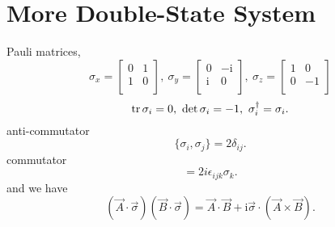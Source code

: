 
\setcounter{chapter}{10}
\chapter[更多的双态系统]{More Double-State System}

Pauli matrices, 
\begin{equation}
  \sigma_{x} = \begin{bmatrix}
   0 & 1\\
   1 & 0\\
  \end{bmatrix}
  , \ 
  \sigma_{y} = \begin{bmatrix}
   0 & -\mathrm{i} \\
   \mathrm{i}  & 0\\
  \end{bmatrix}
  , \
  \sigma_{z} = \begin{bmatrix}
   1 & 0\\
   0 & -1\\
  \end{bmatrix}
\end{equation}
\begin{equation}
  \tr \sigma_i = 0,\ \det \sigma_i = -1,\ \sigma_i ^{\dagger} = \sigma_i.
\end{equation}
anti-commutator
\begin{equation}
    \{ \sigma_i, \sigma_j \} = 2 \delta_{ij}.
\end{equation}
commutator
\begin{equation}
  [\sigma_{i}, \sigma_j] = 2 i \epsilon_{ijk} \sigma_k.
\end{equation}
and we have
\begin{equation}
  \left( \vec{A} \cdot \vec{\sigma} \right) \left( \vec{B}\cdot \vec{\sigma} \right) = \vec{A}\cdot \vec{B} + \mathrm{i} \vec{\sigma} \cdot \left( \vec{A} \times \vec{B} \right).
\end{equation}

